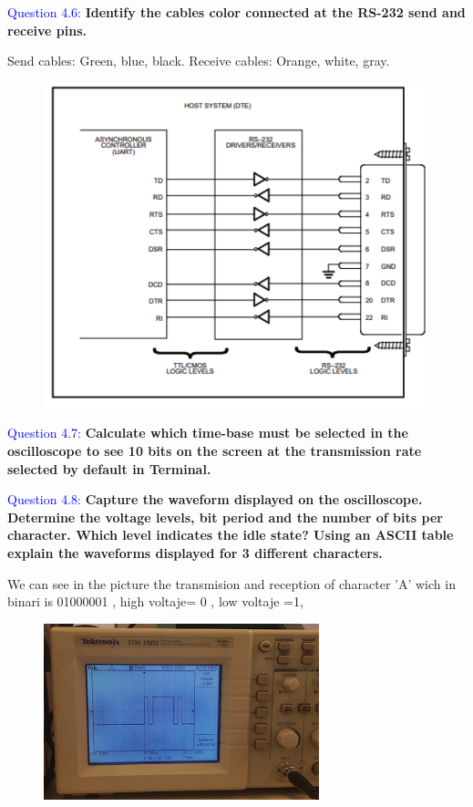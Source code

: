 \documentclass[12pt, a4papre]{article}
\begin{document}
	\textcolor{blue}{Question 4.6:}  \textbf{Identify the cables color connected at the RS-232 send and receive pins.}
	
	Send cables: Green, blue, black.
	Receive cables: Orange, white, gray.
	
	\begin{figure}[H]
		\begin{center}
		\includegraphics[width=130mm]{Foto4_6.png}
		\end{center}
	\end{figure}


	\textcolor{blue}{Question 4.7:}  \textbf{Calculate which time-base must be selected in the oscilloscope to see 10 bits on the screen at the transmission rate selected by default in Terminal. }

	\textcolor{blue}{Question 4.8:} \textbf{Capture the waveform displayed on the oscilloscope. Determine the voltage levels, bit period and the number of bits per character. Which level indicates the idle state? Using an ASCII table explain the waveforms displayed for 3 different characters.}
	
	We can see in the picture the transmision and reception of character 'A' wich in binari is 01000001 , high voltaje= 0 , low voltaje =1,
	
	\begin{figure}[H]
		\begin{center}
		\includegraphics[width=80mm]{LletraA4_8.png}
		\end{center}
	\end{figure}
\end{document}
